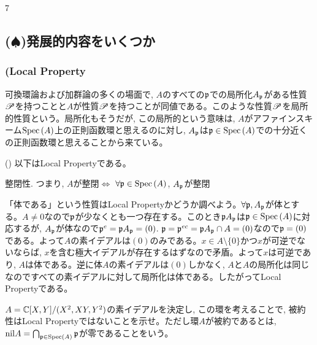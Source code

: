 7
\subsection{($\spadesuit$)発展的内容をいくつか}
\subsubsection{(Local Property}
可換環論および加群論の多くの場面で, $A$のすべての$\mathfrak{p}$での局所化$A_{\mathfrak{p}}$がある性質$\mathscr{P}$を持つことと$A$が性質$\mathscr{P}$を持つことが同値である。このような性質$\mathscr{P}$を局所的性質という。局所化もそうだが, この局所的という意味は, $A$がアファインスキーム$\mathrm{Spec}\left( A \right)$上の正則函数環と思えるのに対し, $A_{\mathfrak{p}}$は$\mathfrak{p}\in \mathrm{Spec}\left( A \right)$での十分近くの正則函数環と思えることから来ている。
\begin{prop} ()
以下はLocal Propertyである。
\ben
\item 整閉性. つまり, $A$が整閉$\iff$ $\forall \mathfrak{p}\in \mathrm{Spec}\left( A \right)$, $A_{\mathfrak{p}}$が整閉
\item
\een
\end{prop}
\begin{eg}
「体である」という性質はLocal Propertyかどうか調べよう。$\forall \mathfrak{p}, A_{\mathfrak{p}}$が体とする。$A\neq 0$なので$\mathfrak{p}$が少なくとも一つ存在する。このとき$\mathfrak{p}A_{\mathfrak{p}}$は$\mathfrak{p}\in \mathrm{Spec}\left( A \right)$に対応するが, $A_{\mathfrak{p}}$が体なので$\mathfrak{p}^{e} = \mathfrak{p}A_{\mathfrak{p}} = (0)$. $\mathfrak{p} = \mathfrak{p}^{ec} = \mathfrak{p}A_{\mathfrak{p}}\cap A = (0)$なので$\mathfrak{p}=(0)$である。よって$A$の素イデアルは$(0)$のみである。$x\in A\setminus{\{ 0 \}}$かつ$x$が可逆でないならば, $x$を含む極大イデアルが存在するはずなので矛盾。よって$x$は可逆であり, $A$は体である。逆に体$A$の素イデアルは$(0)$しかなく, $A$と$A$の局所化は同じなのですべての素イデアルに対して局所化は体である。したがってLocal Propertyである。
\end{eg}
\begin{prac}
$A=\mathbb{C}[X,Y]/(X^2,XY,Y^2)$の素イデアルを決定し, この環を考えることで, 被約性はLocal Propertyではないことを示せ。ただし環$A$が被約であるとは, $\mathrm{nil}{A} = \bigcap_{\mathfrak{p}\in \mathrm{Spec}\left( A \right)}\mathfrak{p}$が零であることをいう。
\end{prac}

